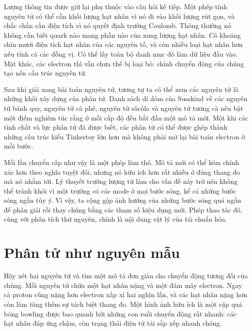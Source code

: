 Lượng thông tin được giữ lại phụ thuộc vào câu hỏi kế tiếp. Một phép tính nguyên tử có thể cần khối lượng hạt nhân vì nó đi vào khối lượng rút gọn, và chắc chắn cần điện tích vì nó quyết định trường Coulomb. Thông thường nó không cần biết quark nào mang phần nào của xung lượng hạt nhân. Có khoảng chín mươi điện tích hạt nhân của các nguyên tố, và còn nhiều loại hạt nhân hơn nếu tính cả các đồng vị. Có thể lấy toàn bộ danh mục đó làm dữ liệu đầu vào. Mặt khác, các electron thì vẫn chưa thể bị loại bỏ: chính chuyển động của chúng tạo nên cấu trúc nguyên tử.

Sau khi giải xong bài toán nguyên tử, tương tự ta có thể xem các nguyên tử là những khối xây dựng của phân tử. Danh sách dí dỏm của Susskind về các nguyên tử bánh quy, nguyên tử cà phê, nguyên tử sôcôla và nguyên tử tương cà nêu bật một điểm nghiêm túc rằng ở mỗi cấp độ đều bắt đầu một mô tả mới. Một khi các tính chất và lực phân tử đã được biết, các phân tử có thể được ghép thành những cấu trúc kiểu Tinkertoy lớn hơn mà không phải mở lại bài toán electron ở mỗi bước.

Mỗi lần chuyển cấp như vậy là một phép làm thô. Mô tả mới có thể kém chính xác hơn theo nghĩa tuyệt đối, nhưng nó hữu ích hơn rất nhiều ở đúng thang đo mà nó nhằm tới. Lý thuyết trường lượng tử làm cho vấn đề này trở nên không thể tránh khỏi vì một trường có các mode ở mọi bước sóng, kể cả những bước sóng ngắn tùy ý. Vì vậy, ta cộng gộp ảnh hưởng của những bước sóng quá ngắn để phân giải rồi thay chúng bằng các tham số hiệu dụng mới. Phép thao tác đó, cùng với phân tích thứ nguyên, chính là nội dung vật lý của tái chuẩn hóa.

\section{Phân tử như nguyên mẫu}

Hãy xét hai nguyên tử và tìm một mô tả đơn giản cho chuyển động tương đối của chúng. Mỗi nguyên tử chứa một hạt nhân nặng và một đám mây electron. Ngay cả proton cũng nặng hơn electron xấp xỉ hai nghìn lần, và các hạt nhân nặng hơn còn làm tăng thêm sự tách biệt thang đo. Một hình ảnh hữu ích là một cặp quả bóng bowling được bao quanh bởi những con ruồi chuyển động rất nhanh: các hạt nhân đáp ứng chậm, còn trạng thái điện tử tái sắp xếp nhanh chóng.

